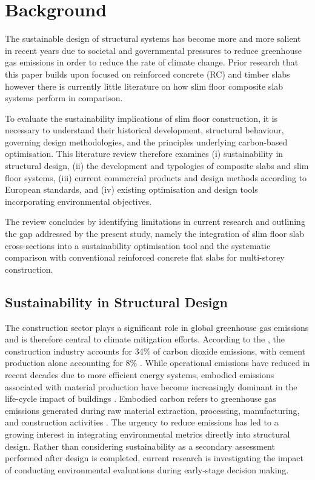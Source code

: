 \section{Background}
\label{secondchapter}
The sustainable design of structural systems has become more and more salient in recent years due to societal and governmental pressures to reduce greenhouse gas emissions in order to reduce the rate of climate change. Prior research that this paper builds upon focused on reinforced concrete (RC) and timber slabs however there is currently little literature on how slim floor composite slab systems perform in comparison.

To evaluate the sustainability implications of slim floor construction, it is necessary to understand their historical development, structural behaviour, governing design methodologies, and the principles underlying carbon-based optimisation. This literature review therefore examines (i) sustainability in structural design, (ii) the development and typologies of composite slabs and slim floor systems, (iii) current commercial products and design methods according to European standards, and (iv) existing optimisation and design tools incorporating environmental objectives.

The review concludes by identifying limitations in current research and outlining the gap addressed by the present study, namely the integration of slim floor slab cross-sections into a sustainability optimisation tool and the systematic comparison with conventional reinforced concrete flat slabs for multi-storey construction.
\subsection{Sustainability in Structural Design}
The construction sector plays a significant role in global greenhouse gas emissions and is therefore central to climate mitigation efforts. According to the \cite{RefWorks:2025brick}, the construction industry accounts for 34\% of carbon dioxide emissions, with cement production alone accounting for 8\% \citep{RefWorks:kaufmann2026stahlbeton}. While operational emissions have reduced in recent decades due to more efficient energy systems, embodied emissions associated with material production have become increasingly dominant in the life-cycle impact of buildings \citep{RefWorks:broyles2024equations}. Embodied carbon refers to greenhouse gas emissions generated during raw material extraction, processing, manufacturing, and construction activities \citep{RefWorks:arnold2025calculate}. The urgency to reduce emissions has led to a growing interest in integrating environmental metrics directly into structural design. Rather than considering sustainability as a secondary assessment performed after design is completed, current research is investigating the impact of conducting environmental evaluations during early-stage decision making.

